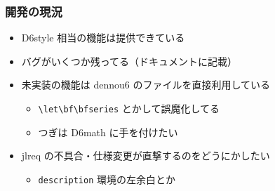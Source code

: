\documentclass[unicode,12pt,colorlinks,]{beamer}
\begin{document}
\begin{frame}[fragile]
	\frametitle{開発の現況}
	\begin{itemize}
		\item D6style 相当の機能は提供できている
		\item バグがいくつか残ってる（ドキュメントに記載）
		\item 未実装の機能は dennou6 のファイルを直接利用している
			\begin{itemize}
				\item \verb|\let\bf\bfseries| とかして誤魔化してる
				\item つぎは D6math に手を付けたい
			\end{itemize}
		\item jlreq の不具合・仕様変更が直撃するのをどうにかしたい
			\begin{itemize}
				\item \texttt{description} 環境の左余白とか
			\end{itemize}
	\end{itemize}
\end{frame}
\end{document}
